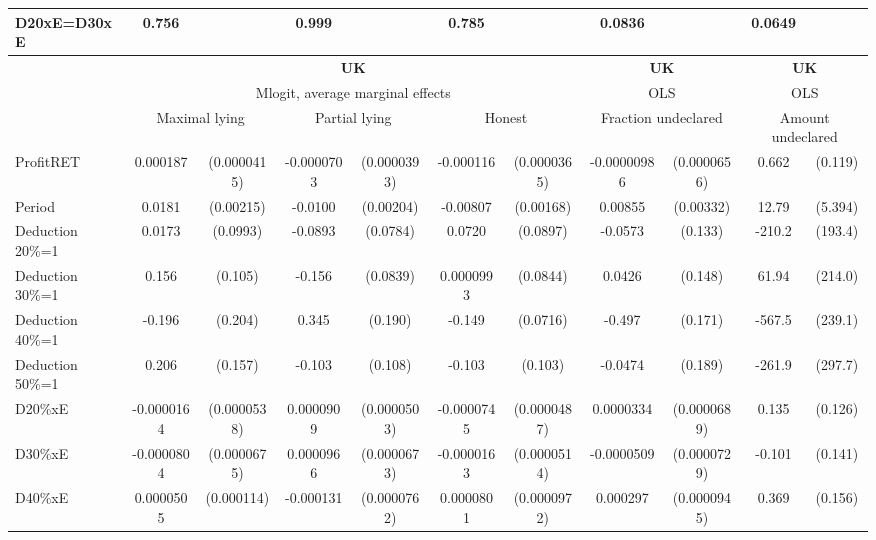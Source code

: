 \begin{tabular}{l|cccccc|cc|cc}
D20xE=D30xE     &    0.756         &         &    0.999         &         &    0.785         &         &   0.0836         &         &   0.0649         &         \\
\hline\hline
&\multicolumn{6}{c|}{\bf UK}&\multicolumn{2}{c|}{\bf UK}&\multicolumn{2}{c}{\bf UK}\\ &\multicolumn{6}{c|}{Mlogit, average marginal effects }&\multicolumn{2}{c|}{OLS}&\multicolumn{2}{c}{OLS}\\
                &\multicolumn{2}{c}{Maximal lying}&\multicolumn{2}{c}{Partial lying}&\multicolumn{2}{c}{Honest}  &\multicolumn{2}{c}{Fraction undeclared}&\multicolumn{2}{c}{Amount undeclared}\\
\hline
ProfitRET       & 0.000187\sym{***}&(0.0000415)&-0.0000703\sym{*}  &(0.0000393)&-0.000116\sym{***}&(0.0000365)&-0.00000986         &(0.0000656)&    0.662\sym{***}&  (0.119)\\
Period          &   0.0181\sym{***}&(0.00215)&  -0.0100\sym{***}&(0.00204)& -0.00807\sym{***}&(0.00168)&  0.00855\sym{**} &(0.00332)&    12.79\sym{**} &  (5.394)\\
Deduction 20\%=1&   0.0173         & (0.0993)&  -0.0893         & (0.0784)&   0.0720         & (0.0897)&  -0.0573         &  (0.133)&   -210.2         &  (193.4)\\
Deduction 30\%=1&    0.156         &  (0.105)&   -0.156\sym{*}  & (0.0839)&0.0000993         & (0.0844)&   0.0426         &  (0.148)&    61.94         &  (214.0)\\
Deduction 40\%=1&   -0.196         &  (0.204)&    0.345\sym{*}  &  (0.190)&   -0.149\sym{**} & (0.0716)&   -0.497\sym{***}&  (0.171)&   -567.5\sym{**} &  (239.1)\\
Deduction 50\%=1&    0.206         &  (0.157)&   -0.103         &  (0.108)&   -0.103         &  (0.103)&  -0.0474         &  (0.189)&   -261.9         &  (297.7)\\
D20\%xE         &-0.0000164         &(0.0000538)&0.0000909\sym{*}  &(0.0000503)&-0.0000745         &(0.0000487)&0.0000334         &(0.0000689)&    0.135         &  (0.126)\\
D30\%xE         &-0.0000804         &(0.0000675)&0.0000966         &(0.0000673)&-0.0000163         &(0.0000514)&-0.0000509         &(0.0000729)&   -0.101         &  (0.141)\\
D40\%xE         &0.0000505         &(0.000114)&-0.000131\sym{*}  &(0.0000762)&0.0000801         &(0.0000972)& 0.000297\sym{***}&(0.0000945)&    0.369\sym{**} &  (0.156)\\

\end{tabular}
